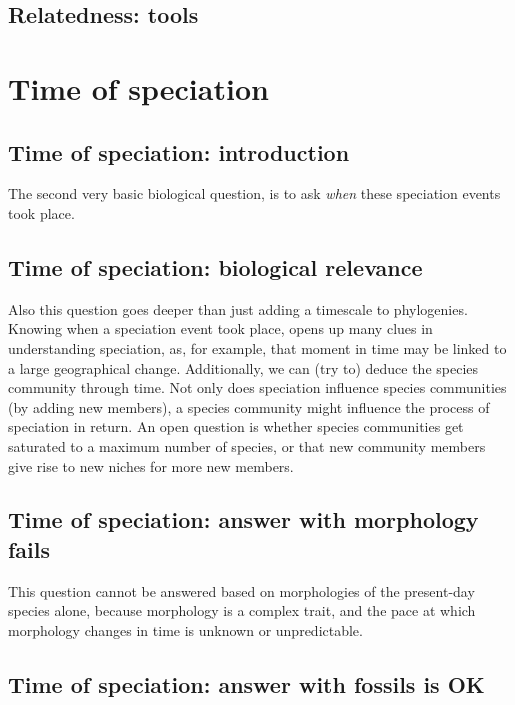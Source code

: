 \subsection{Relatedness: tools}


\section{Time of speciation}

\subsection{Time of speciation: introduction}

The second very basic biological question, is to 
ask \emph{when} these speciation events took place.

\subsection{Time of speciation: biological relevance}

Also this question goes deeper than just 
adding a timescale to phylogenies.
Knowing when a speciation event took place,
opens up many clues in understanding speciation, as,
for example, that moment in time may be linked to a large geographical change.
Additionally, we can (try to) deduce the species community through time.
Not only does speciation influence species communities (by adding
new members), a species community might influence the process of speciation
in return. An open question is whether species communities get
saturated to a maximum number of species, or that new community members
give rise to new niches for more new members.

\subsection{Time of speciation: answer with morphology fails}

This question cannot be answered based on morphologies of the present-day
species alone, because morphology is a complex trait, and the pace at
which morphology changes in time is unknown or unpredictable.

\subsection{Time of speciation: answer with fossils is OK}


